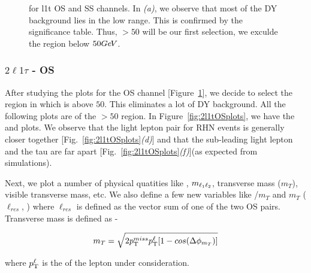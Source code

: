 \documentclass[letterpaper,12pt]{article}
\newcommand{\GeV}{{Ge\kern -0.1em V}}
\begin{document}
\begin{figure}[h]
  \caption[\metpt{} for \2l1t-OS and \2l1t-SS]{\metpt{} for \2l1t OS and SS channels. In \emph{(a)}, we observe that most of the DY background lies in the low \metpt{} range. This is confirmed by the significance table. Thus, \metpt $>50$ will be our first selection, \ie{} we exculde the region below $50\GeV$.}
  \label{fig:2l1tmetpt}
\end{figure}

\subsubsection{{\Large{\boldmath$2\ell1\tau$}} - OS}
\label{sec:2l1tOS}

After studying the \metpt{} plots for the OS channel [Figure~\ref{fig:2l1tmetpt}], we decide to select the region in which \metpt{} is above $50$. This eliminates a lot of DY background. All the following plots are of the \metpt{} $>50$ region. In Figure~\ref{fig:2l1tOSplots}, we have the \pt{} and \DeltaR{} plots. We observe that the light lepton pair for RHN events is generally closer together [Fig.~\ref{fig:2l1tOSplots}\emph{(d)}] and that the sub-leading light lepton and the tau are far apart [Fig.~\ref{fig:2l1tOSplots}\emph{(f)}](as expected from simulations).

Next, we plot a number of physical quatities like \dphi, $m_{\ell_{1}\ell_{2}}$, transverse mass ($m_{T}$), visible transverse mass, etc. We also define a few new variables like \MET/$m_{T}$ and $m_{T}$ ($\ell_{res}$, \MET) where $\ell_{res}$ is defined as the vector sum of one of the two OS pairs. Transverse mass is defined as -

\[
m_{T} = \sqrt{2p_{\mathrm{T}}^{miss}p_{\mathrm{T}}^{\ell}[1 - cos(\Delta \phi_{m_{T}})]}
\]

where $p_{\mathrm{T}}^{\ell}$ is the \pt{} of the lepton under consideration.
\end{document}
